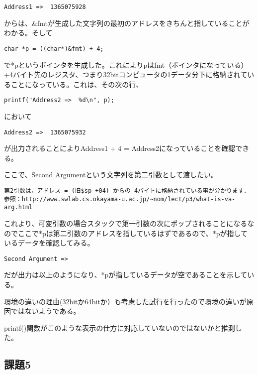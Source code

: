 \documentclass[a4j]{jarticle}
\begin{document}
\begin{verbatim}
Address1 =>  1365075928
\end{verbatim}

からは、\&fmtが生成した文字列の最初のアドレスをきちんと指していることがわかる。そして

\begin{verbatim}
char *p = ((char*)&fmt) + 4;
\end{verbatim}

で*pというポインタを生成した。これによりpはfmt（ポインタになっている）+4バイト先のレジスタ、つまり32bitコンピュータの1データ分下に格納されていることになっている。これは、その次の行、

\begin{verbatim}
printf("Address2 =>  %d\n", p);
\end{verbatim}

において

\begin{verbatim}
Address2 =>  1365075932
\end{verbatim}

が出力されることによりAddress1 + 4 = Address2になっていることを確認できる。

ここで、Second Argumentという文字列を第二引数として渡したい。

\begin{verbatim}
第2引数は，アドレス = (旧$sp +04) からの 4バイトに格納されている事が分かります．
参照：http://www.swlab.cs.okayama-u.ac.jp/~nom/lect/p3/what-is-va-arg.html
\end{verbatim}

これより、可変引数の場合スタックで第一引数の次にポップされることになるなのでここで*pは第二引数のアドレスを指しているはずであるので、*pが指しているデータを確認してみる。

\begin{verbatim}
Second Argument => 
\end{verbatim}

だが出力は以上のようになり、*pが指しているデータが空であることを示している。

環境の違いの理由(32bitか64bitか）も考慮した試行を行ったので環境の違いが原因ではないようである。

printf()関数がこのような表示の仕方に対応していないのではないかと推測した。


\subsection{課題5}
\end{document}
